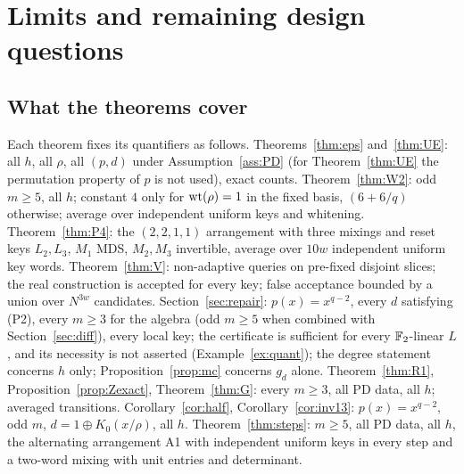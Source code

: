 \section{Limits and remaining design questions}\label{sec:limits}

\subsection{What the theorems cover}
Each theorem fixes its quantifiers as follows.
Theorems~\ref{thm:eps} and~\ref{thm:UE}: all $h$, all $\rho$, all $(p,d)$ under Assumption~\ref{ass:PD} (for
Theorem~\ref{thm:UE} the permutation property of $p$ is not used), exact counts.
Theorem~\ref{thm:W2}: odd $m\ge5$, all $h$; constant $4$ only for $\mathrm{wt}(\rho)=1$ in the fixed basis,
$(6+6/q)$ otherwise; average over independent uniform keys and whitening.
Theorem~\ref{thm:P4}: the $(2,2,1,1)$ arrangement with three mixings and reset keys $L_2,L_3$,
$M_1$ MDS, $M_2,M_3$ invertible, average over $10w$ independent uniform key words.
Theorem~\ref{thm:V}: non-adaptive queries on pre-fixed disjoint slices; the real construction is accepted for
every key; false acceptance bounded by a union over $N^{3w}$ candidates.
Section~\ref{sec:repair}: $p(x)=x^{q-2}$, every $d$ satisfying (P2), every $m\ge3$ for the algebra (odd $m\ge5$ when
combined with Section~\ref{sec:diff}), every local key; the certificate is sufficient for every $\mathbb{F}_2$-linear $L$, and its
necessity is not asserted (Example~\ref{ex:quant}); the degree statement concerns $h$ only; Proposition~\ref{prop:mc} concerns $g_d$ alone.
Theorem~\ref{thm:R1}, Proposition~\ref{prop:Zexact}, Theorem~\ref{thm:G}: every $m\ge3$, all PD data, all $h$; averaged transitions.
Corollary~\ref{cor:half}, Corollary~\ref{cor:inv13}: $p(x)=x^{q-2}$, odd $m$, $d=1\oplus K_0(x/\rho)$, all $h$.
Theorem~\ref{thm:steps}: $m\ge5$, all PD data, all $h$, the alternating arrangement A1 with independent uniform keys in every step and a
two-word mixing with unit entries and determinant.

